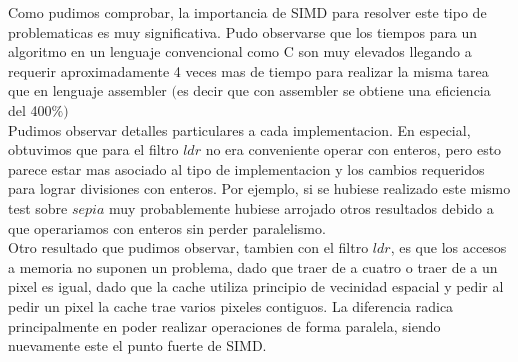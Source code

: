 Como pudimos comprobar, la importancia de SIMD para resolver este tipo de problematicas es muy significativa. 
Pudo observarse que los tiempos para un algoritmo en un lenguaje convencional como C son muy elevados llegando a requerir aproximadamente 4 veces mas de tiempo para realizar la misma tarea que en lenguaje assembler $($es decir que con assembler se obtiene una eficiencia del 400$ \% )$\\

Pudimos observar detalles particulares a cada implementacion. En especial, obtuvimos que para el filtro $ldr$ no era conveniente operar con enteros, pero esto parece estar mas asociado al tipo de implementacion y los cambios requeridos para lograr divisiones con enteros. Por ejemplo, si se hubiese realizado este mismo test sobre $sepia$ muy probablemente hubiese arrojado otros resultados debido a que operariamos con enteros sin perder paralelismo.\\

Otro resultado que pudimos observar, tambien con el filtro $ldr$, es que los accesos a memoria no suponen un problema, dado que traer de a cuatro o traer de a un pixel es igual, dado que la cache utiliza principio de vecinidad espacial y pedir al pedir un pixel la cache trae varios pixeles contiguos. La diferencia radica principalmente en poder realizar operaciones de forma paralela, siendo nuevamente este el punto fuerte de SIMD. \\


